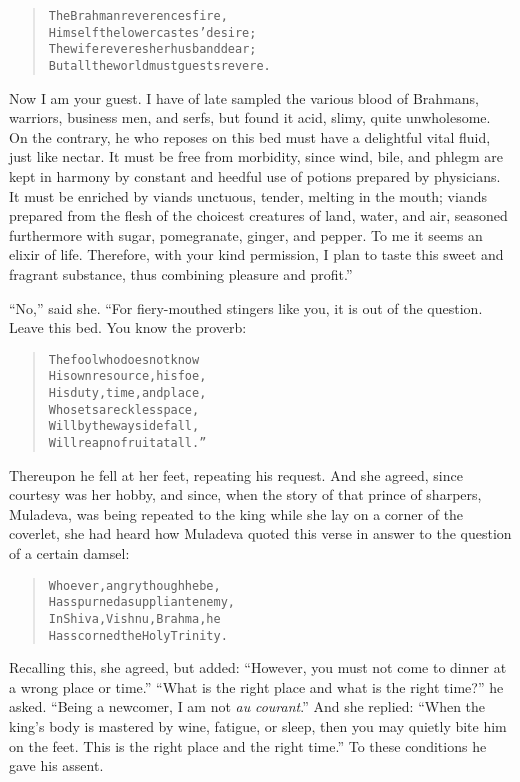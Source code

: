 \documentclass[article, twoside, 14pt]{memoir}
\renewenvironment{verbatim}{%
\begin{quote}%
\vskip -10pt%
\begin{alltt}\normalfont\large}{\end{alltt}%
\end{quote}%
\vskip -10pt
} %
\begin{document}
\begin{verbatim}
The Brahman reverences fire,
Himself the lower castes' desire;
The wife reveres her husband dear;
But all the world must guests revere.
\end{verbatim}
Now I am your guest. I have of late sampled the various blood of
Brahmans, warriors, business men, and serfs, but found it acid,
slimy, quite unwholesome. On the contrary, he who reposes on this
bed must have a delightful vital fluid, just like nectar. It must
 be free from morbidity, since wind, bile, and phlegm are kept
in harmony by constant and heedful use of potions prepared by
physicians. It must be enriched by viands unctuous, tender, melting
in the mouth; viands prepared from the flesh of the choicest
creatures of land, water, and air, seasoned furthermore with sugar,
pomegranate, ginger, and pepper. To me it seems an elixir of life.
Therefore, with your kind permission, I plan to taste this sweet
and fragrant substance, thus combining pleasure and profit.”

``No,'' said she. “For fiery-mouthed stingers like you, it is out
of the question. Leave this bed. You know the proverb:

\begin{verbatim}
The fool who does not know
His own resource, his foe,
His duty, time, and place,
Who sets a reckless pace,
Will by the wayside fall,
Will reap no fruit at all.”
\end{verbatim}
Thereupon he fell at her feet, repeating his request. And she
agreed, since courtesy was her hobby, and since, when the story of
that prince of sharpers, Muladeva, was being repeated to the king
while she lay on a corner of the coverlet, she had heard how
Muladeva quoted this verse in answer to the question of a certain
damsel:

\begin{verbatim}
Whoever, angry though he be,
Has spurned a suppliant enemy,
In Shiva, Vishnu, Brahma, he
Has scorned the Holy Trinity.
\end{verbatim}
Recalling this, she agreed, but added:
``However, you must not come to dinner at a wrong place or time.''
``What is the right place and what is the right time?'' he asked.
``Being a newcomer, I am not \emph{au} \emph{courant}.'' And she
replied:
``When the king's body is mastered by wine, fatigue, or sleep, then you may quietly bite him on the feet. This is the right place and the right time.''
To these conditions he gave his assent.
\end{document}
